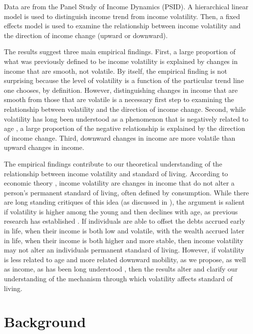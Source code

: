 \documentclass[12pt]{article}
\begin{document}
Data are from the Panel Study of Income Dynamics (PSID). A hierarchical linear model is used to distinguish income trend from income volatility. Then, a fixed effects model is used to examine the relationship between income volatility and the direction of income change (upward or downward).

The results suggest three main empirical findings.  First, a large proportion of what was previously defined to be income volatility is explained by changes in income that are smooth, not volatile. By itself, the empirical finding is not surprising because the level of volatility is a function of the particular trend line one chooses, by definition. However, distinguishing changes in income that are smooth from those that are volatile is a necessary first step to examining the relationship between volatility and the direction of income change. Second, while volatility has long been understood as a phenomenon that is negatively related to age \citep{gottschalk_moffitt_1994}, a large proportion of the negative relationship is explained by the direction of income change.  Third, downward changes in income are more volatile than upward changes in income.

The empirical findings contribute to our theoretical understanding of the relationship between income volatility and standard of living. According to economic theory \citep{friedman_1957}, income volatility are changes in income that do not alter a person's permanent standard of living, often defined by consumption. While there are long standing critiques of this idea (as discussed in \citealp{blundell_1988}), the argument is salient if volatility is higher among the young and then declines with age, as previous research has established \citep{gundersen_ziliak_2008}. If individuals are able to offset the debts accrued early in life, when their income is both low and volatile, with the wealth accrued later in life, when their income is both higher and more stable, then income volatility may not alter an individuals permanent standard of living. However, if volatility is less related to age and more related downward mobility, as we propose, as well as income, as has been long understood \citep{bane_ellwood_1986}, then the results alter and clarify our understanding of the mechanism through which volatility affects standard of living.

\section{Background}
\end{document}
